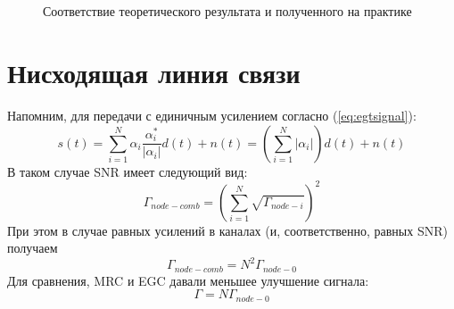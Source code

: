 \documentclass[a4paper,12pt,oneside, abstract=true]{scrartcl}
\begin{document}
\begin{figure}[!htb]
\begin{minipage}[h]{1\linewidth}
 \\
\end{minipage}
\vfill
\begin{minipage}[h]{1\linewidth}
 \\
\end{minipage}
\caption{Соответствие теоретического результата и полученного на практике}
\label{fig:SNRtheory}
\end{figure}

\clearpage
\section{Нисходящая линия связи}

Напомним, для передачи с единичным усилением согласно (\ref{eq:egtsignal}):
\begin{equation}
s\left(t\right)=\sum\limits_{i=1}^N \alpha_i\frac{\alpha^*_i}{|\alpha_i|}d\left(t\right) + n\left(t\right) = \left(\sum\limits_{i=1}^N |\alpha_i|\right)d\left(t\right) + n\left(t\right)
\end{equation}
В таком случае SNR имеет следующий вид:
\begin{equation}
\Gamma_{node-comb} = \left(\sum\limits_{i=1}^{N}\sqrt{\Gamma_{node-i}}\right)^2
\end{equation}
При этом в случае равных усилений в каналах (и, соответственно, равных SNR) получаем 
\begin{equation}
\label{eq:equalSNR}
\Gamma_{node-comb} = N^2\Gamma_{node-0}
\end{equation}
Для сравнения, MRC и EGC давали меньшее улучшение сигнала:
\begin{equation}
\label{eq:equalSNRMRC}
\Gamma = N\Gamma_{node-0}
\end{equation}
\end{document}
